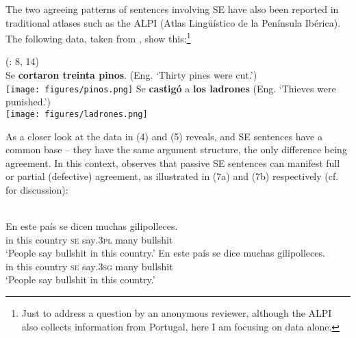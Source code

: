 \documentclass[output=paper]{langsci/langscibook}
\begin{document}
The two agreeing patterns of sentences involving SE have also been reported in traditional atlases such as the ALPI (Atlas Lingüístico de la Península Ibérica). The following data, taken from \citet{Benito2010}, show this:\footnote{Just to address a question by an anonymous reviewer, although the ALPI also collects information from Portugal, here I am focusing on  data alone.}\largerpage[1.5] 

\ea%
    (\citealt{Benito2010}: 8, 14)
    \label{ex:gallego:6}\\
    \ea Se \textbf{cortaron treinta pinos}. (Eng. ‘Thirty pines were cut.’)\\
          \texttt{[image: figures/pinos.png]}
    \ex Se \textbf{castigó} a \textbf{los ladrones} (Eng. ‘Thieves were punished.’)\\
          \texttt{[image: figures/ladrones.png]}
    \z
\z

As a closer look at the data in (4) and (5) reveals,  and  SE sentences have a common base – they have the same argument structure, the only difference being agreement. In this context, \citet[§26.3.2.2]{Mendikoetxea1999} observes that passive SE sentences can manifest full or partial (defective) agreement, as illustrated in (7a) and (7b) respectively (cf. \citealt{Martín1979} for discussion):

\ea%
    \label{ex:gallego:7}\\
    \ea
    \gll En  este  país        se   dicen       muchas  gilipolleces.       \\
         in   this   country  \textsc{se}  say\textsc{{}.3pl}  many     bullshit\\
    \glt ‘People say bullshit in this country.’
    \ex
    \gll En  este  país        se   dice        muchas  gilipolleces.       \\
         in   this   country  \textsc{se} say\textsc{{}.3sg}  many     bullshit \\
    \glt ‘People say bullshit in this country.’
    \z
\z\largerpage[-2]
\end{document}
